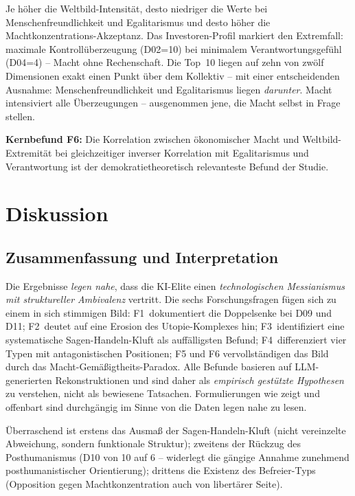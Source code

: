 \documentclass[12pt,a4paper]{article}
\begin{document}
Je h\"oher die Weltbild-Intensit\"at, desto niedriger die Werte bei Menschenfreundlichkeit und Egalitarismus und desto h\"oher die Machtkonzentrations-Akzeptanz. Das Investoren-Profil markiert den Extremfall: maximale Kontroll\"uberzeugung (D02=10) bei minimalem Verantwortungsgef\"uhl (D04=4) -- \glqq Macht ohne Rechenschaft\grqq. Die Top~10 liegen auf zehn von zw\"olf Dimensionen exakt einen Punkt \"uber dem Kollektiv -- mit einer entscheidenden Ausnahme: Menschenfreundlichkeit und Egalitarismus liegen \emph{darunter}. Macht intensiviert alle \"Uberzeugungen -- ausgenommen jene, die Macht selbst in Frage stellen.

\medskip
\noindent\textbf{Kernbefund F6:} Die Korrelation zwischen \"okonomischer Macht und Weltbild-Extremit\"at bei gleichzeitiger inverser Korrelation mit Egalitarismus und Verantwortung ist der demokratietheoretisch relevanteste Befund der Studie.


\section{Diskussion}
\label{sec:diskussion}

\subsection{Zusammenfassung und Interpretation}
\label{sec:diskussion:zusammenfassung}

Die Ergebnisse \emph{legen nahe}, dass die KI-Elite einen \emph{technologischen Messianismus mit struktureller Ambivalenz} vertritt. Die sechs Forschungsfragen f\"ugen sich zu einem in sich stimmigen Bild: F1~dokumentiert die \glqq Doppelsenke\grqq{} bei D09 und D11; F2~deutet auf eine Erosion des Utopie-Komplexes hin; F3~identifiziert eine systematische Sagen-Handeln-Kluft als auff\"alligsten Befund; F4~differenziert vier Typen mit antagonistischen Positionen; F5 und F6 vervollst\"andigen das Bild durch das Macht-Gem\"a\ss{}igtheits-Paradox. Alle Befunde basieren auf LLM-generierten Rekonstruktionen und sind daher als \emph{empirisch gest\"utzte Hypothesen} zu verstehen, nicht als bewiesene Tatsachen. Formulierungen wie \glqq zeigt\grqq{} und \glqq offenbart\grqq{} sind durchg\"angig im Sinne von \glqq die Daten legen nahe\grqq{} zu lesen.

\"Uberraschend ist erstens das Ausma\ss{} der Sagen-Handeln-Kluft (nicht vereinzelte Abweichung, sondern funktionale Struktur); zweitens der R\"uckzug des Posthumanismus (D10 von 10 auf 6 -- widerlegt die g\"angige Annahme zunehmend posthumanistischer Orientierung); drittens die Existenz des Befreier-Typs (Opposition gegen Machtkonzentration auch von libert\"arer Seite).
\end{document}

